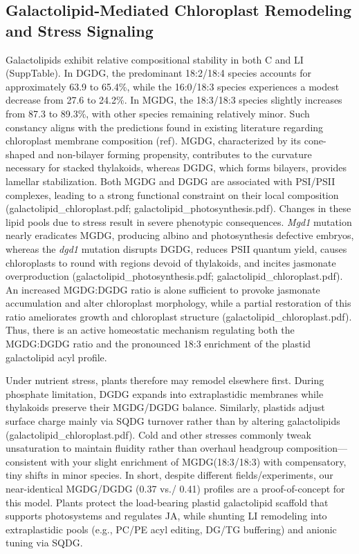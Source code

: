 \documentclass[10pt,letterpaper]{article}
\begin{document}
\begin{itemize}
\subsection*{Galactolipid-Mediated Chloroplast Remodeling and Stress Signaling}
Galactolipids exhibit relative compositional stability in both C and LI (SuppTable). In DGDG, the predominant 18:2/18:4 species accounts for approximately 63.9 to 65.4\%, while the 16:0/18:3 species experiences a modest decrease from 27.6 to 24.2\%. In MGDG, the 18:3/18:3 species slightly increases from 87.3 to 89.3\%, with other species remaining relatively minor. Such constancy aligns with the predictions found in existing literature regarding chloroplast membrane composition (ref). MGDG, characterized by its cone-shaped and non-bilayer forming propensity, contributes to the curvature necessary for stacked thylakoids, whereas DGDG, which forms bilayers, provides lamellar stabilization. Both MGDG and DGDG are associated with PSI/PSII complexes, leading to a strong functional constraint on their local composition (galactolipid\_chloroplast.pdf; galactolipid\_photosynthesis.pdf). Changes in these lipid pools due to stress result in severe phenotypic consequences. \textit{Mgd1} mutation nearly eradicates MGDG, producing albino and photosynthesis defective embryos, whereas the \textit{dgd1} mutation disrupts DGDG, reduces PSII quantum yield, causes chloroplasts to round with regions devoid of thylakoids, and incites jasmonate overproduction (galactolipid\_photosynthesis.pdf; galactolipid\_chloroplast.pdf). An increased MGDG:DGDG ratio is alone sufficient to provoke jasmonate accumulation and alter chloroplast morphology, while a partial restoration of this ratio ameliorates growth and chloroplast structure (galactolipid\_chloroplast.pdf). Thus, there is an active homeostatic mechanism regulating both the MGDG:DGDG ratio and the pronounced 18:3 enrichment of the plastid galactolipid acyl profile.

Under nutrient stress, plants therefore may remodel elsewhere first. During phosphate limitation, DGDG expands into extraplastidic membranes while thylakoids preserve their MGDG/DGDG balance. Similarly, plastids adjust surface charge mainly via SQDG turnover rather than by altering galactolipids (galactolipid\_chloroplast.pdf). Cold and other stresses commonly tweak unsaturation to maintain fluidity rather than overhaul headgroup composition—consistent with your slight enrichment of MGDG(18:3/18:3) with compensatory, tiny shifts in minor species. In short, despite different fields/experiments, our near-identical MGDG/DGDG (0.37 vs./ 0.41) profiles are a proof-of-concept for this model. Plants protect the load-bearing plastid galactolipid scaffold that supports photosystems and regulates JA, while shunting LI remodeling into extraplastidic pools (e.g., PC/PE acyl editing, DG/TG buffering) and anionic tuning via SQDG.



\end{itemize}
\end{document}
